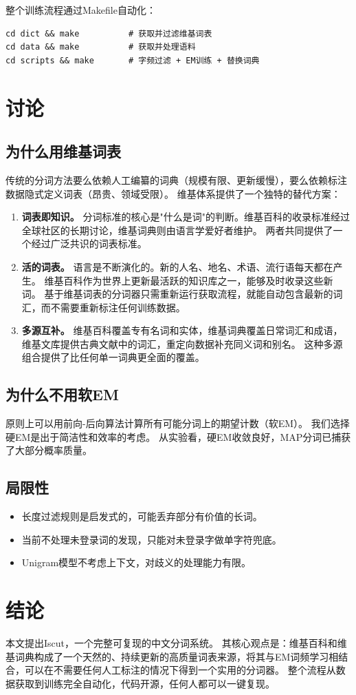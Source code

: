 \documentclass[11pt,a4paper]{article}
\begin{document}
整个训练流程通过Makefile自动化：

\begin{verbatim}
cd dict && make          # 获取并过滤维基词表
cd data && make          # 获取并处理语料
cd scripts && make       # 字频过滤 + EM训练 + 替换词典
\end{verbatim}

\section{讨论}

\subsection{为什么用维基词表}

传统的分词方法要么依赖人工编纂的词典（规模有限、更新缓慢），要么依赖标注数据隐式定义词表（昂贵、领域受限）。
维基体系提供了一个独特的替代方案：

\begin{enumerate}
    \item \textbf{词表即知识。}
    分词标准的核心是"什么是词"的判断。维基百科的收录标准经过全球社区的长期讨论，维基词典则由语言学爱好者维护。
    两者共同提供了一个经过广泛共识的词表标准。

    \item \textbf{活的词表。}
    语言是不断演化的。新的人名、地名、术语、流行语每天都在产生。
    维基百科作为世界上更新最活跃的知识库之一，能够及时收录这些新词。
    基于维基词表的分词器只需重新运行获取流程，就能自动包含最新的词汇，而不需要重新标注任何训练数据。

    \item \textbf{多源互补。}
    维基百科覆盖专有名词和实体，维基词典覆盖日常词汇和成语，维基文库提供古典文献中的词汇，重定向数据补充同义词和别名。
    这种多源组合提供了比任何单一词典更全面的覆盖。
\end{enumerate}

\subsection{为什么不用软EM}

原则上可以用前向-后向算法计算所有可能分词上的期望计数（软EM）。
我们选择硬EM是出于简洁性和效率的考虑。
从实验看，硬EM收敛良好，MAP分词已捕获了大部分概率质量。

\subsection{局限性}

\begin{itemize}
    \item 长度过滤规则是启发式的，可能丢弃部分有价值的长词。
    \item 当前不处理未登录词的发现，只能对未登录字做单字符兜底。
    \item Unigram模型不考虑上下文，对歧义的处理能力有限。
\end{itemize}

\section{结论}

本文提出Iscut，一个完整可复现的中文分词系统。
其核心观点是：维基百科和维基词典构成了一个天然的、持续更新的高质量词表来源，将其与EM词频学习相结合，可以在不需要任何人工标注的情况下得到一个实用的分词器。
整个流程从数据获取到训练完全自动化，代码开源，任何人都可以一键复现。
\end{document}
